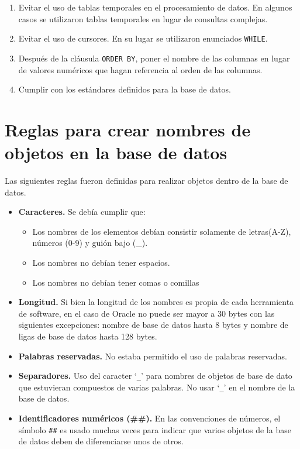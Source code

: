\begin{enumerate}
\item Evitar el uso de tablas temporales en el procesamiento de datos. En
  algunos casos se utilizaron tablas temporales en lugar de consultas complejas.

\item Evitar el uso de cursores. En su lugar se utilizaron enunciados
  \texttt{WHILE}.

\item Después de la cláusula \texttt{ORDER BY}, poner el nombre de las columnas
  en lugar de valores numéricos que hagan referencia al orden de las columnas.

\item Cumplir con los estándares definidos para la base de datos.

\end{enumerate}

\section{Reglas para crear nombres de objetos en la base de datos}

Las siguientes reglas fueron definidas para realizar objetos dentro de la base
de datos.

\begin{itemize}

\item \textbf{Caracteres.} Se debía cumplir que:

  \begin{itemize}
  \item Los nombres de los elementos debían consistir solamente de letras(A-Z),
    números (0-9) y guión bajo (\_).
  \item Los nombres no debían tener espacios.
  \item Los nombres no debían tener comas o comillas
  \end{itemize}

\item \textbf{Longitud.} Si bien la longitud de los nombres es propia de cada
  herramienta de software, en el caso de Oracle no puede ser mayor a 30 bytes
  con las siguientes excepciones: nombre de base de datos hasta 8 bytes y nombre
  de ligas de base de datos hasta 128 bytes.

\item \textbf{Palabras reservadas.} No estaba permitido el uso de palabras
  reservadas.

\item \textbf{Separadores.} Uso del caracter `\texttt{\_}' para nombres de
  objetos de base de dato que estuvieran compuestos de varias palabras. No usar
  `\texttt{\_}' en el nombre de la base de datos.

\item \textbf{Identificadores numéricos (\#\#).} En las convenciones de números,
  el símbolo \texttt{\#\#} es usado muchas veces para indicar que varios objetos
  de la base de datos deben de diferenciarse unos de otros.

\end{itemize}

